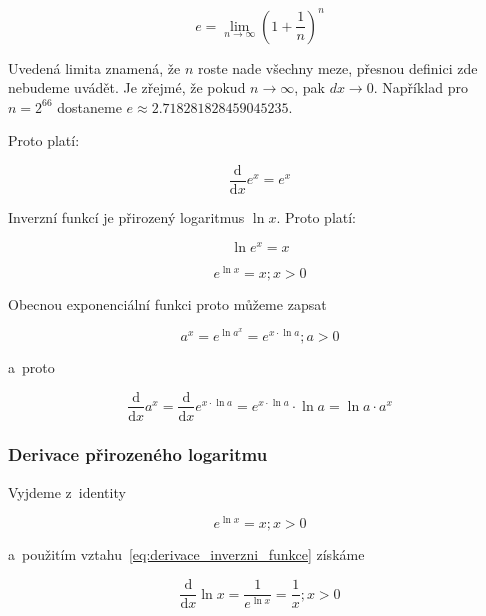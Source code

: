 \begin{equation}
e = \lim_{n \to \infty} \left(1 + \frac{1}{n}\right)^n
\end{equation}

Uvedená limita znamená, že \(n\) roste nade všechny meze, přesnou definici zde nebudeme uvádět. Je zřejmé, že pokud \(n \to \infty\), pak \(dx \to 0\). Například pro \(n = 2^{66}\) dostaneme \(e \approx 2.718281828459045235\).

Proto platí:

\begin{equation}
\frac{\mathrm{d}}{\mathrm{d}x} e^x = e^x
\end{equation}

Inverzní funkcí je přirozený logaritmus \(\ln x\). Proto platí:

\begin{equation}
\ln e^x = x
\end{equation}

\begin{equation}
e^{\ln x} = x; x > 0
\end{equation}

Obecnou exponenciální funkci proto můžeme zapsat

\begin{equation}
a^x = e^{\ln a^x} = e^{x \cdot \ln a}; a > 0
\end{equation}

a~proto

\begin{equation}
\frac{\mathrm{d}}{\mathrm{d}x} a^x = \frac{\mathrm{d}}{\mathrm{d}x} e^{x \cdot \ln a} = e^{x \cdot \ln a} \cdot \ln a = \ln a \cdot a^x
\end{equation}

\subsubsection{Derivace přirozeného logaritmu}

Vyjdeme z~identity

\begin{equation}
e^{\ln x} = x; x > 0
\end{equation}

a~použitím vztahu~\eqref{eq:derivace_inverzni_funkce} získáme

\begin{equation}
\frac{\mathrm{d}}{\mathrm{d}x} \ln x = \frac{1}{e^{\ln x}} = \frac{1}{x}; x > 0
\end{equation}


